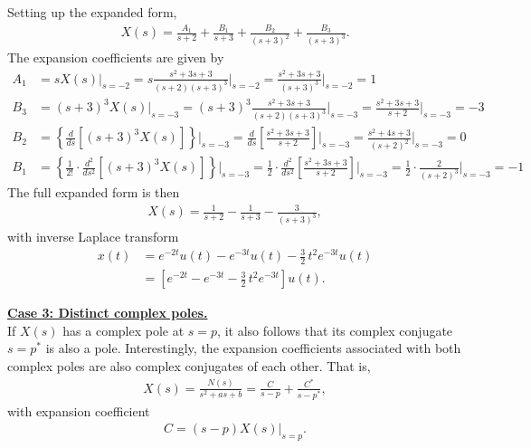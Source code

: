 \documentclass{report}
\begin{document}
\begin{solution}
    Setting up the expanded form, 
    \begin{align*}
        X(s) = \frac{A_1}{s+2} + \frac{B_1}{s+3} + \frac{B_2}{(s+3)^2} + \frac{B_3}{(s+3)^3}.
    \end{align*}
    The expansion coefficients are given by 
    \begin{align*}
        A_1 &= sX(s)\big|_{s=-2} = s\frac{s^2+3s+3}{(s+2)(s+3)^3}\bigg|_{s=-2} = \frac{s^2+3s+3}{(s+3)^3}\bigg|_{s=-2} = 1 \\[0.5cm]
        B_3 &= (s+3)^3X(s)\big|_{s=-3} = (s+3)^3\frac{s^2+3s+3}{(s+2)(s+3)^3}\bigg|_{s=-3} = \frac{s^2+3s+3}{s+2}\bigg|_{s=-3} = -3 \\[0.5cm]
        B_2 &= \left\{\frac{d}{ds}[(s+3)^3X(s)]\right\}\bigg|_{s=-3} = \frac{d}{ds}\left[\frac{s^2+3s+3}{s+2}\right]\bigg|_{s=-3} = \frac{s^2+4s+3}{(s+2)^2}\bigg|_{s=-3} = 0 \\[0.5cm]
        B_1 &= \left\{\frac{1}{2!}\cdot\frac{d^2}{ds^2}[(s+3)^3X(s)]\right\}\bigg|_{s=-3} = \frac{1}{2}\cdot\frac{d^2}{ds^2}\left[\frac{s^2+3s+3}{s+2}\right]\bigg|_{s=-3} = \frac{1}{2}\cdot\frac{2}{(s+2)^3}\bigg|_{s=-3} = -1
    \end{align*}
    The full expanded form is then 
    \begin{align*}
        X(s) = \frac{1}{s+2} - \frac{1}{s+3} - \frac{3}{(s+3)^3},
    \end{align*}
    with inverse Laplace transform 
    \begin{align*}
        x(t) &= e^{-2t}u(t) - e^{-3t}u(t) - \frac{3}{2}\,t^2e^{-3t}u(t) \\ 
        &= \left[e^{-2t} - e^{-3t} - \frac{3}{2}\,t^2e^{-3t}\right] u(t).
    \end{align*}
\end{solution}
\begin{tcolorbox}[width=\textwidth,colback={white}, sharp corners]
    \textbf{\underline{Case 3: Distinct complex poles.}} \\[0.25cm]
    If $X(s)$ has a complex pole at $s=p$, it also follows that its complex conjugate $s=p^*$ is also a pole. Interestingly, the expansion coefficients associated with 
    both complex poles are also complex conjugates of each other. That is, 
    \begin{align}
        X(s) = \frac{N(s)}{s^2+as+b} = \frac{C}{s-p} + \frac{C^*}{s-p^*},
    \end{align}
    with expansion coefficient 
    \begin{align}
        C = (s-p)X(s)\big|_{s=p}.
    \end{align}
\end{tcolorbox}
\end{document}
